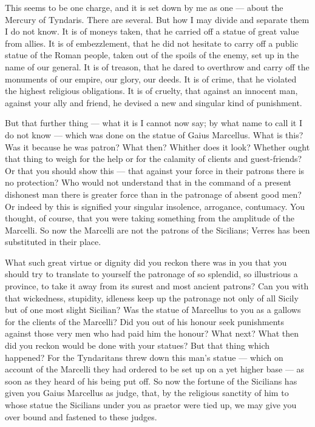  This seems to be one charge, and it is set down by me as one --- about the Mercury of Tyndaris. There are several. But how I may divide and separate them I do not know. It is of moneys taken, that he carried off a statue of great value from allies. It is of embezzlement, that he did not hesitate to carry off a public statue of the Roman people, taken out of the spoils of the enemy, set up in the name of our general. It is of treason, that he dared to overthrow and carry off the monuments of our empire, our glory, our deeds. It is of crime, that he violated the highest religious obligations. It is of cruelty, that against an innocent man, against your ally and friend, he devised a new and singular kind of punishment.

 But that further thing --- what it is I cannot now say; by what name to call it I do not know --- which was done on the statue of Gaius Marcellus. What is this? Was it because he was patron? What then? Whither does it look? Whether ought that thing to weigh for the help or for the calamity of clients and guest-friends? Or that you should show this --- that against your force in their patrons there is no protection? Who would not understand that in the command of a present dishonest man there is greater force than in the patronage of absent good men? Or indeed by this is signified your singular insolence, arrogance, contumacy. You thought, of course, that you were taking something from the amplitude of the Marcelli. So now the Marcelli are not the patrons of the Sicilians; Verres has been substituted in their place.

 What such great virtue or dignity did you reckon there was in you that you should try to translate to yourself the patronage of so splendid, so illustrious a province, to take it away from its surest and most ancient patrons? Can you with that wickedness, stupidity, idleness keep up the patronage not only of all Sicily but of one most slight Sicilian? Was the statue of Marcellus to you as a gallows for the clients of the Marcelli? Did you out of his honour seek punishments against those very men who had paid him the honour? What next? What then did you reckon would be done with your statues? But that thing which happened? For the Tyndaritans threw down this man's statue --- which on account of the Marcelli they had ordered to be set up on a yet higher base --- as soon as they heard of his being put off. So now the fortune of the Sicilians has given you Gaius Marcellus as judge, that, by the religious sanctity of him to whose statue the Sicilians under you as praetor were tied up, we may give you over bound and fastened to these judges.

